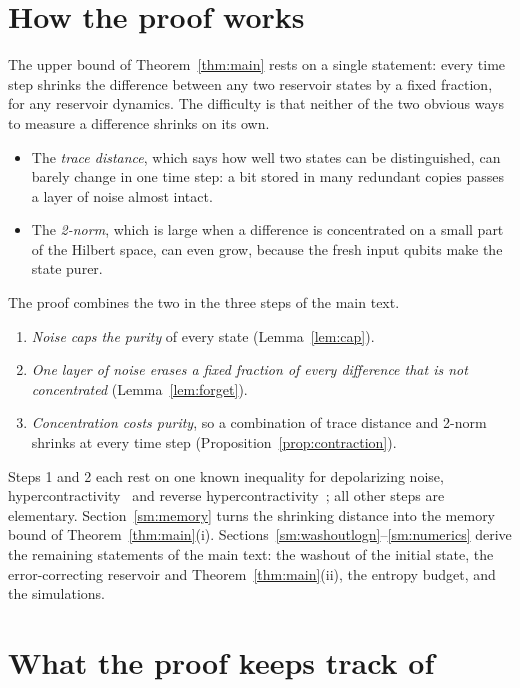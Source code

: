 \documentclass[aps,prl,twocolumn,superscriptaddress,floatfix]{revtex4-2}
\theoremstyle{plain}
\begin{document}
\section{How the proof works}
\label{sm:overview}

The upper bound of Theorem~\ref{thm:main} rests on a single statement: every time step shrinks the difference between any two reservoir states by a fixed fraction, for any reservoir dynamics. The difficulty is that neither of the two obvious ways to measure a difference shrinks on its own.
\begin{itemize}
\item The \emph{trace distance}, which says how well two states can be distinguished, can barely change in one time step: a bit stored in many redundant copies passes a layer of noise almost intact.
\item The \emph{2-norm}, which is large when a difference is concentrated on a small part of the Hilbert space, can even grow, because the fresh input qubits make the state purer.
\end{itemize}
The proof combines the two in the three steps of the main text.
\begin{enumerate}
\item \emph{Noise caps the purity} of every state (Lemma~\ref{lem:cap}).
\item \emph{One layer of noise erases a fixed fraction of every difference that is not concentrated} (Lemma~\ref{lem:forget}).
\item \emph{Concentration costs purity}, so a combination of trace distance and 2-norm shrinks at every time step (Proposition~\ref{prop:contraction}).
\end{enumerate}
Steps 1 and 2 each rest on one known inequality for depolarizing noise, hypercontractivity~\cite{King2014} and reverse hypercontractivity~\cite{Cubitt2015}; all other steps are elementary. Section~\ref{sm:memory} turns the shrinking distance into the memory bound of Theorem~\ref{thm:main}(i). Sections~\ref{sm:washoutlogn}--\ref{sm:numerics} derive the remaining statements of the main text: the washout of the initial state, the error-correcting reservoir and Theorem~\ref{thm:main}(ii), the entropy budget, and the simulations.

\section{What the proof keeps track of}
\label{sm:norms}
\end{document}
